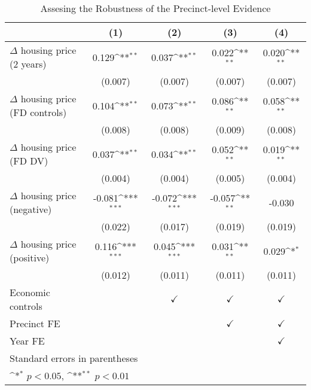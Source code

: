 \begin{table}[htbp]\centering
	\def\sym#1{\ifmmode^{#1}\else\(^{#1}\)\fi}
	\caption{Assesing the Robustness of the Precinct-level Evidence} \label{robustness}
	\begin{tabular}{l*{4}{c}}
		\hline\hline
		&\multicolumn{1}{c}{(1)}        &\multicolumn{1}{c}{(2)}        &\multicolumn{1}{c}{(3)}        &\multicolumn{1}{c}{(4)}        \\
\hline
$\Delta$ housing price (2 years)&       0.129\sym{**}&       0.037\sym{**}&       0.022\sym{**}&       0.020\sym{**}\\
&     (0.007)        &     (0.007)        &     (0.007)        &     (0.007)        \\
[1em]
$\Delta$ housing price (FD controls)&       0.104\sym{**}&       0.073\sym{**}&       0.086\sym{**}&       0.058\sym{**}\\
&     (0.008)        &     (0.008)        &     (0.009)        &     (0.008)        \\
[1em]
$\Delta$ housing price (FD DV)&       0.037\sym{**}&       0.034\sym{**}&       0.052\sym{**}&       0.019\sym{**}\\
&     (0.004)        &     (0.004)        &     (0.005)        &     (0.004)        \\
[1em]
$\Delta$ housing price (negative)&      -0.081\sym{***}&      -0.072\sym{***}&      -0.057\sym{**} &      -0.030         \\
&     (0.022)         &     (0.017)         &     (0.019)         &     (0.019)         \\
[1em]
$\Delta$ housing price (positive)&       0.116\sym{***}&       0.045\sym{***}&       0.031\sym{**} &       0.029\sym{*}  \\
&     (0.012)         &     (0.011)         &     (0.011)         &     (0.011)         \\
[1em]
\hline Economic controls  &                    & $\checkmark$                    &$\checkmark$        &$\checkmark$        \\
[1em]
Precinct FE  &                    &                    &$\checkmark$        &$\checkmark$        \\
[1em]
Year FE             &                    &                    &                    &$\checkmark$        \\
\hline\hline
\multicolumn{5}{l}{\footnotesize Standard errors in parentheses}\\
\multicolumn{5}{l}{\footnotesize \sym{*} \(p<0.05\), \sym{**} \(p<0.01\)}\\
\end{tabular}
\end{table}